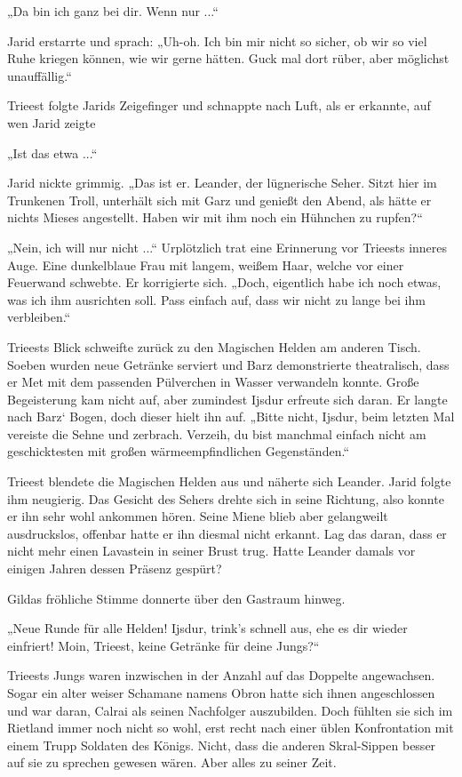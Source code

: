 „Da bin ich ganz bei dir. Wenn nur ...“

Jarid erstarrte und sprach: „Uh-oh. Ich bin mir nicht so sicher, ob wir so viel Ruhe kriegen können, wie wir gerne hätten. Guck mal dort rüber, aber möglichst unauffällig.“

Trieest folgte Jarids Zeigefinger und schnappte nach Luft, als er erkannte, auf wen Jarid zeigte

„Ist das etwa ...“

Jarid nickte grimmig. „Das ist er. Leander, der lügnerische Seher. Sitzt hier im Trunkenen Troll, unterhält sich mit Garz und genießt den Abend, als hätte er nichts Mieses angestellt. Haben wir mit ihm noch ein Hühnchen zu rupfen?“

„Nein, ich will nur nicht ...“ Urplötzlich trat eine Erinnerung vor Trieests inneres Auge. Eine dunkelblaue Frau mit langem, weißem Haar, welche vor einer Feuerwand schwebte. Er korrigierte sich. „Doch, eigentlich habe ich noch etwas, was ich ihm ausrichten soll. Pass einfach auf, dass wir nicht zu lange bei ihm verbleiben.“

Trieests Blick schweifte zurück zu den Magischen Helden am anderen Tisch. Soeben wurden neue Getränke serviert und Barz demonstrierte theatralisch, dass er Met mit dem passenden Pülverchen in Wasser verwandeln konnte. Große Begeisterung kam nicht auf, aber zumindest Ijsdur erfreute sich daran. Er langte nach Barz‘ Bogen, doch dieser hielt ihn auf. „Bitte nicht, Ijsdur, beim letzten Mal vereiste die Sehne und zerbrach. Verzeih, du bist manchmal einfach nicht am geschicktesten mit großen wärmeempfindlichen Gegenständen.“

Trieest blendete die Magischen Helden aus und näherte sich Leander. Jarid folgte ihm neugierig. Das Gesicht des Sehers drehte sich in seine Richtung, also konnte er ihn sehr wohl ankommen hören. Seine Miene blieb aber gelangweilt ausdruckslos, offenbar hatte er ihn diesmal nicht erkannt. Lag das daran, dass er nicht mehr einen Lavastein in seiner Brust trug. Hatte Leander damals vor einigen Jahren dessen Präsenz gespürt?

Gildas fröhliche Stimme donnerte über den Gastraum hinweg.

„Neue Runde für alle Helden! Ijsdur, trink’s schnell aus, ehe es dir wieder einfriert! Moin, Trieest, keine Getränke für deine Jungs?“

Trieests Jungs waren inzwischen in der Anzahl auf das Doppelte angewachsen. Sogar ein alter weiser Schamane namens Obron hatte sich ihnen angeschlossen und war daran, Calrai als seinen Nachfolger auszubilden. Doch fühlten sie sich im Rietland immer noch nicht so wohl, erst recht nach einer üblen Konfrontation mit einem Trupp Soldaten des Königs. Nicht, dass die anderen Skral-Sippen besser auf sie zu sprechen gewesen wären. Aber alles zu seiner Zeit.

